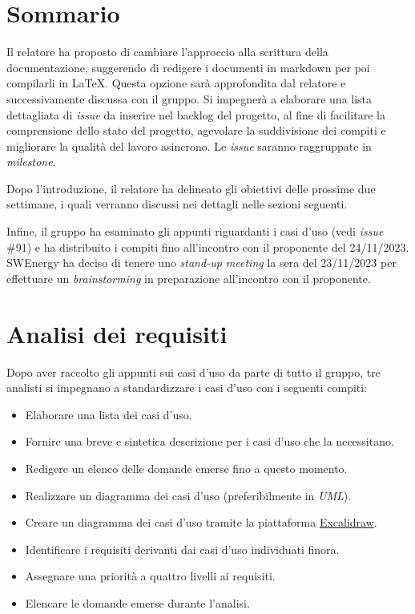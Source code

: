 \section{Sommario}

Il relatore ha proposto di cambiare l'approccio alla scrittura della
documentazione, suggerendo di redigere i documenti in markdown per poi
compilarli in \LaTeX{}. Questa opzione sarà approfondita dal relatore e
successivamente discussa con il gruppo. Si impegnerà a elaborare una lista
dettagliata di \textit{issue} da inserire nel backlog del progetto, al fine di
facilitare la comprensione dello stato del progetto, agevolare la suddivisione
dei compiti e migliorare la qualità del lavoro asincrono. Le \textit{issue}
saranno raggruppate in \textit{milestone}.

Dopo l'introduzione, il relatore ha delineato gli obiettivi delle prossime due
settimane, i quali verranno discussi nei dettagli nelle sezioni seguenti.

Infine, il gruppo ha esaminato gli appunti riguardanti i casi d'uso (vedi
\textit{issue} \#91) e ha distribuito i compiti fino all'incontro con il
proponente del 24/11/2023. SWEnergy ha deciso di tenere uno \textit{stand-up
	meeting} la sera del 23/11/2023 per effettuare un \textit{brainstorming} in
preparazione all'incontro con il proponente.

\section{Analisi dei requisiti}

Dopo aver raccolto gli appunti sui casi d'uso da parte di tutto il gruppo, tre
analisti si impegnano a standardizzare i casi d'uso con i seguenti compiti:

\begin{itemize}
	\item Elaborare una lista dei casi d'uso.
	\item Fornire una breve e sintetica descrizione per i casi d'uso che la
	      necessitano.
	\item Redigere un elenco delle domande emerse fino a questo momento.
	\item Realizzare un diagramma dei casi d'uso (preferibilmente in
	      \textit{UML}).
	\item Creare un diagramma dei casi d'uso tramite la piattaforma
	      \href{https://excalidraw.com/}{Excalidraw}.
	\item Identificare i requisiti derivanti dai casi d'uso individuati finora.
	\item Assegnare una priorità a quattro livelli ai requisiti.
	\item Elencare le domande emerse durante l'analisi.
\end{itemize}

